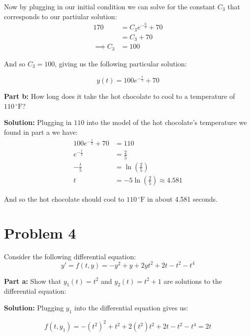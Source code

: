\documentclass{article}
\begin{document}
Now by plugging in our initial condition we can solve for the constant $C_3$ that corresponds to our partiular solution:
\begin{align*}
    170&=C_3e^{-\frac{0}{5}}+70\tag{$(t,y)=(0,170)$}\\
    &=C_3+70\\
    \implies C_3&=100
\end{align*}

And so $C_3=100$, giving us the following particular solution:

\begin{equation*}
    y(t)=100e^{-\frac{t}{5}}+70
\end{equation*}

\bigskip

\noindent\textbf{Part b:}  How long does it take the hot chocolate to cool to a temperature of $110\,{^\circ\text{F}}$?
\bigskip

\noindent\textbf{Solution:} Plugging in $110$ into the model of the hot chocolate's temperature we found in part a we have:
\begin{align*}
    100e^{-\frac{t}{5}}+70&=110\tag{$y(t)=110$}\\
    e^{-\frac{t}{5}}&=\frac{2}{5}\tag{algebra}\\
    -\frac{t}{5}&=\ln\left(\frac{2}{5}\right)\tag{$\ln()$ both sides}\\    
    t&=-5\ln\left(\frac{2}{5}\right)\approx4.581\tag{algebra}
\end{align*}

And so the hot chocolate should cool to $110\,{^\circ\text{F}}$ in about 4.581 seconds.

\section*{Problem 4}
Consider the following differential equation:
\begin{equation*}
    y'=f(t,y)=-y^2+y+2yt^2+2t-t^2-t^4
\end{equation*}
\smallskip

\noindent\textbf{Part a:} Show that $y_1(t)=t^2$ and $y_2(t)=t^2+1$ are solutions to the differential equation:
\bigskip

\noindent\textbf{Solution:} Plugging $y_1$ into the differential equation gives us:

\begin{equation*}
    f(t,y_1)=-(t^2)^2+t^2+2(t^2)t^2+2t-t^2-t^4=2t
\end{equation*}
\end{document}
